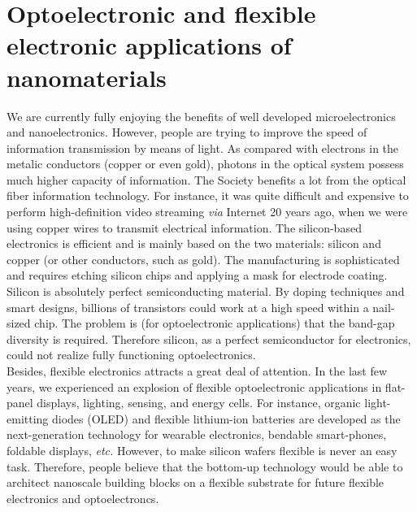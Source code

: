 \section{Optoelectronic and flexible electronic applications of nanomaterials}
We are currently fully enjoying the benefits of well developed microelectronics and nanoelectronics. However, people are trying to improve the speed of information transmission by means of light. As compared with electrons in the metalic conductors (copper or even gold), photons in the optical system possess much higher capacity of information. The Society benefits a lot from the optical fiber information technology. For instance, it was quite difficult and expensive to perform high-definition video streaming \textit{via} Internet 20 years ago, when we were using copper wires to transmit electrical information. 
The silicon-based electronics is efficient and is mainly based on the two materials: silicon and copper (or other conductors, such as gold). The manufacturing is sophisticated and requires etching silicon chips and applying a mask for electrode coating. Silicon is absolutely perfect semiconducting material. By doping techniques and smart designs, billions of transistors could work at a high speed within a nail-sized chip. The problem is (for optoelectronic applications) that the band-gap diversity is required. Therefore silicon, as a perfect semiconductor for electronics, could not realize fully functioning optoelectronics. \\ 
Besides, flexible electronics attracts a great deal of attention. In the last few years, we experienced an explosion of flexible optoelectronic applications in flat-panel displays, lighting, sensing, and energy cells. For instance, organic light-emitting diodes (OLED) and flexible lithium-ion batteries are developed as the next-generation technology for wearable electronics, bendable smart-phones, foldable displays, \textit{etc.} However, to make silicon wafers flexible is never an easy task. Therefore, people believe that the bottom-up technology would be able to architect nanoscale building blocks on a flexible substrate for future flexible electronics and optoelectroncs. \\

